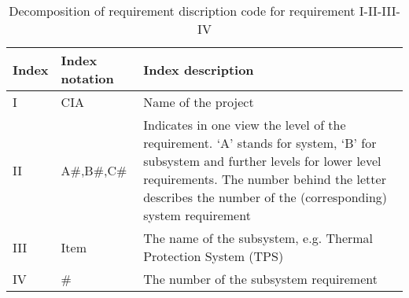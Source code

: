 \begin{table}[H]
\vspace{-4mm}
    \caption {Decomposition of requirement discription code for requirement I-II-III-IV}
    \begin{tabular}{|p{}|p{}|p{}|}
    \hline
    Index & Index notation   & Index description                                                                                                                                  \\ \hline \hline
    I            & CIA                     & Name of the project                                                                                                                            \\ \hline
    II           & A\#,B\#,C\#                & Indicates in one view the level of the requirement. `A' stands for system, `B' for subsystem  and further levels for lower level requirements. The number behind the letter describes the number of the (corresponding) system requirement
\\ \hline
    III            & Item                    & The name of the subsystem, e.g. Thermal Protection System (TPS)                                                                                                 \\ \hline
    IV            & \#			           & The number of the subsystem requirement                                                                                                      \\ \hline
    \end{tabular}
    \label{tab:description}
\end{table}

